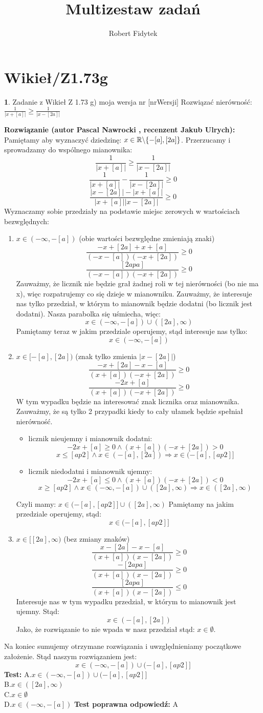 \documentclass[12pt, a4paper]{article}
\title{Multizestaw zadań}
\author{Robert Fidytek}
\date{}
\theoremstyle{definition} %
\newtheorem{zad}{}
\newcommand{\kategoria}[1]{\section{#1}} %
\newcommand{\zadStart}[1]{\begin{zad}#1\newline} %
\newcommand{\zadStop}{\end{zad}}   %
\newcommand{\rozwStart}[2]{\noindent \textbf{Rozwiązanie (autor #1 , recenzent #2): }\newline} %
\newcommand{\odpStop}{\newline}                                             %
\newcommand{\testStart}{\noindent \textbf{Test:}\newline} %
\newcommand{\testStop}{\newline} %
\newcommand{\kluczStart}{\noindent \textbf{Test poprawna odpowiedź:}\newline} %
\newcommand{\kluczStop}{\newline} %
\begin{document}
\maketitle


\kategoria{Wikieł/Z1.73g}
\zadStart{Zadanie z Wikieł Z 1.73 g) moja wersja nr [nrWersji]}
Rozwiązać nierówność: $\frac{1}{|x+[a]|}\geq\frac{1}{|x-[2a]|}$
\zadStop
\rozwStart{Pascal Nawrocki}{Jakub Ulrych}
Pamiętamy aby wyznaczyć dziedzinę: $x\in\mathbb{R}\symbol{92}\{-[a],[2a]\}$.
Przerzucamy i sprowadzamy do wspólnego mianownika:
$$\frac{1}{|x+[a]|}\geq\frac{1}{|x-[2a]|}$$
$$\frac{1}{|x+[a]|}-\frac{1}{|x-[2a]|}\geq0$$
$$\frac{|x-[2a]|-|x+[a]|}{|x+[a]||x-[2a]|}\geq0$$
Wyznaczamy sobie przedziały na podstawie miejsc zerowych w wartościach bezwględnych:
\begin{enumerate}
\item $x\in(-\infty,-[a])$ (obie wartości bezwględne zmieniają znaki)
$$\frac{-x+[2a]+x+[a]}{(-x-[a])(-x+[2a])}\geq0$$
$$\frac{[2apa]}{(-x-[a])(-x+[2a])}\geq0$$
Zauważmy, że licznik nie będzie grał żadnej roli w tej nierówności (bo nie ma x), więc rozpatrujemy co się dzieje w mianowniku. Zauważmy, że interesuje nas tylko przedział, w którym to mianownik będzie dodatni (bo licznik jest dodatni). Nasza parabolka się uśmiecha, więc:
$$x\in(-\infty,-[a])\cup([2a],\infty)$$
Pamiętamy teraz w jakim przedziale operujemy, stąd interesuje nas tylko:
$$x\in(-\infty,-[a])$$
\item $x\in[-[a],[2a])$ (znak tylko zmienia $|x-[2a]|$)
$$\frac{-x+[2a]-x-[a]}{(x+[a])(-x+[2a])}\geq0$$
$$\frac{-2x+[a]}{(x+[a])(-x+[2a])}\geq0$$
W tym wypadku będzie na interesować znak licznika oraz mianownika. Zauważmy, że są tylko 2 przypadki kiedy to cały ułamek będzie spełniał nierówność.
\begin{itemize}
\item licznik nieujemny i mianownik dodatni:
$$-2x+[a]\geq0 \wedge (x+[a])(-x+[2a])>0$$
$$x\leq[ap2] \wedge x\in(-[a],[2a])\Rightarrow x\in(-[a],[ap2]]$$
\item licznik niedodatni i mianownik ujemny:
$$-2x+[a]\leq0 \wedge (x+[a])(-x+[2a])<0$$
$$x\geq[ap2] \wedge x\in(-\infty,-[a])\cup([2a],\infty)\Rightarrow x\in([2a],\infty)$$
\end{itemize}
Czyli mamy: $x\in(-[a],[ap2]]\cup([2a],\infty)$
Pamiętamy na jakim przedziale operujemy, stąd:
$$x\in(-[a],[ap2]]$$
\item $x\in[[2a],\infty)$ (bez zmiany znaków)
$$\frac{x-[2a]-x-[a]}{(x+[a])(x-[2a])}\geq0$$
$$\frac{-[2apa]}{(x+[a])(x-[2a])}\geq0$$
$$\frac{[2apa]}{(x+[a])(x-[2a])}\leq0$$
Interesuje nas w tym wypadku przedział, w którym to mianownik jest ujemny. Stąd:
$$x\in(-[a],[2a])$$
Jako, że rozwiązanie to nie wpada w nasz przedział stąd: $x\in\emptyset$.
\end{enumerate}
Na koniec sumujemy otrzymane rozwiązania i uwzględnieniamy początkowe założenie. Stąd naszym rozwiązaniem jest: 
$$x\in(-\infty,-[a])\cup(-[a],[ap2]]$$
\odpStop
\testStart
A.$x\in(-\infty,-[a])\cup(-[a],[ap2]]$
\\
B.$x\in([2a],\infty)$
\\
C.$x\in\emptyset$
\\
D.$x\in(-\infty,-[a])$
\testStop
\kluczStart
A
\kluczStop
\end{document}
